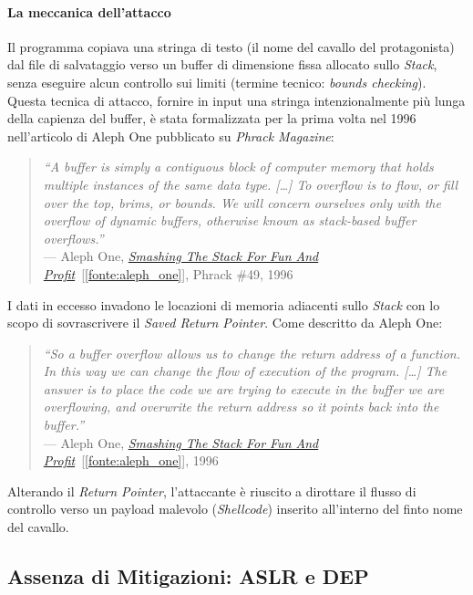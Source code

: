 \paragraph{La meccanica dell'attacco}

Il programma copiava una stringa di testo (il nome del cavallo del protagonista) dal file di salvataggio verso un buffer di dimensione fissa allocato sullo \textit{Stack}, senza eseguire alcun controllo sui limiti (termine tecnico: \textit{bounds checking}).\\
Questa tecnica di attacco, fornire in input una stringa intenzionalmente più lunga della capienza del buffer, è stata formalizzata per la prima volta nel 1996 nell'articolo di Aleph One pubblicato su \textit{Phrack Magazine}:

\begin{quote}
    \textit{``A buffer is simply a contiguous block of computer memory that holds multiple instances of the same data type. [\ldots] To overflow is to flow, or fill over the top, brims, or bounds. We will concern ourselves only with the overflow of dynamic buffers, otherwise known as stack-based buffer overflows.''}\\
    --- Aleph One, \hyperref[fonte:aleph_one]{\textit{Smashing The Stack For Fun And Profit}}~[\ref{fonte:aleph_one}], Phrack \#49, 1996
\end{quote}

I dati in eccesso invadono le locazioni di memoria adiacenti sullo \textit{Stack} con lo scopo di sovrascrivere il \textit{Saved Return Pointer}. Come descritto da Aleph One:

\begin{quote}
    \textit{``So a buffer overflow allows us to change the return address of a function. In this way we can change the flow of execution of the program. [\ldots] The answer is to place the code we are trying to execute in the buffer we are overflowing, and overwrite the return address so it points back into the buffer.''}\\
    --- Aleph One, \hyperref[fonte:aleph_one]{\textit{Smashing The Stack For Fun And Profit}}~[\ref{fonte:aleph_one}], 1996
\end{quote}

Alterando il \textit{Return Pointer}, l'attaccante è riuscito a dirottare il flusso di controllo verso un payload malevolo (\textit{Shellcode}) inserito all'interno del finto nome del cavallo.

\subsection{Assenza di Mitigazioni: ASLR e DEP}

